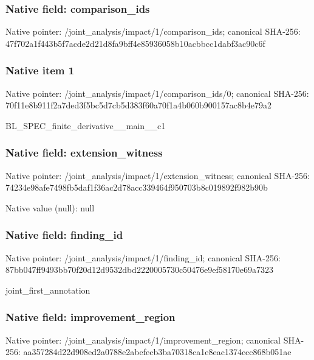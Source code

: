\documentclass[10pt,a4paper]{article}
\begin{document}
\subsubsection{Native field: comparison\_\allowbreak{}ids}
Native pointer: /joint\_\allowbreak{}analysis/impact/1/comparison\_\allowbreak{}ids; canonical SHA-256: 47f702a1f443b5f7acde2d21d8fa9bff4e85936058b10acbbcc1dabf3ac90c6f

\subsubsection{Native item 1}
Native pointer: /joint\_\allowbreak{}analysis/impact/1/comparison\_\allowbreak{}ids/0; canonical SHA-256: 70f11e8b911f2a7ded3f5bc5d7cb5d383f60a70f1a4b060b900157ac8b4e79a2

\begingroup\raggedright\sloppy BL\_\allowbreak{}SPEC\_\allowbreak{}finite\_\allowbreak{}derivative\_\allowbreak{}\_\allowbreak{}main\_\allowbreak{}\_\allowbreak{}c1\par\endgroup

\subsubsection{Native field: extension\_\allowbreak{}witness}
Native pointer: /joint\_\allowbreak{}analysis/impact/1/extension\_\allowbreak{}witness; canonical SHA-256: 74234e98afe7498fb5daf1f36ac2d78acc339464f950703b8c019892f982b90b

Native value (null): null

\subsubsection{Native field: finding\_\allowbreak{}id}
Native pointer: /joint\_\allowbreak{}analysis/impact/1/finding\_\allowbreak{}id; canonical SHA-256: 87bb047ff9493bb70f20d12d9532dbd2220005730c50476e9ef58170e69a7323

\begingroup\raggedright\sloppy joint\_\allowbreak{}first\_\allowbreak{}annotation\par\endgroup

\subsubsection{Native field: improvement\_\allowbreak{}region}
Native pointer: /joint\_\allowbreak{}analysis/impact/1/improvement\_\allowbreak{}region; canonical SHA-256: aa357284d22d908ed2a0788e2abefecb3ba70318ca1e8eac1374ccc868b051ae
\end{document}
